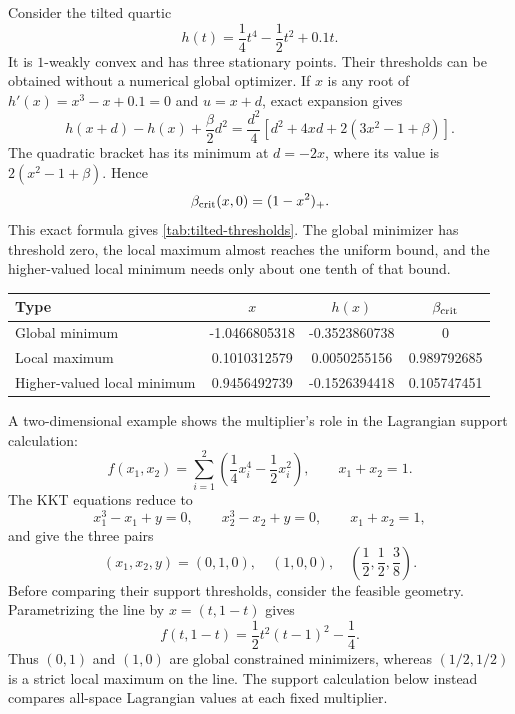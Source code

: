 Consider the tilted quartic
\begin{equation}
  h(t)=\frac14t^4-\frac12t^2+0.1t.
  \label{eq:tilted-quartic}
\end{equation}
It is \(1\)-weakly convex and has three stationary points.  Their thresholds
can be obtained without a numerical global optimizer.  If \(x\) is any root
of \(h'(x)=x^3-x+0.1=0\) and \(u=x+d\), exact expansion gives
\begin{equation}
  h(x+d)-h(x)+\frac{\beta}{2}d^2
  =
  \frac{d^2}{4}
  \left[
    d^2+4xd+2(3x^2-1+\beta)
  \right].
  \label{eq:tilted-quartic-factorization}
\end{equation}
The quadratic bracket has its minimum at \(d=-2x\), where its value is
\(2(x^2-1+\beta)\).  Hence
\begin{equation}
  \beta_{\mathrm{crit}}(x,0)=(1-x^2)_+ .
  \label{eq:tilted-quartic-exact-threshold}
\end{equation}
This exact formula gives \cref{tab:tilted-thresholds}.  The global minimizer
has threshold zero, the local maximum almost reaches the uniform bound, and
the higher-valued local minimum needs only about one tenth of that bound.

\begin{center}
  \captionsetup{hypcap=false}
  \centering
  \label{tab:tilted-thresholds}
  \begin{tabular}{lS[table-format=-1.10]S[table-format=-1.10]S[table-format=1.9]}
    \toprule
    Type & {$x$} & {$h(x)$} & {$\beta_{\mathrm{crit}}$}\\
    \midrule
    Global minimum       & -1.0466805318 & -0.3523860738 & 0\\
    Local maximum        &  0.1010312579 &  0.0050255156 & 0.989792685\\
    Higher-valued local minimum &  0.9456492739 & -0.1526394418 & 0.105747451\\
    \bottomrule
  \end{tabular}
\end{center}

A two-dimensional example shows the multiplier's role in the Lagrangian
support calculation:
\[
  f(x_1,x_2)=\sum_{i=1}^2
       \left(\frac14x_i^4-\frac12x_i^2\right),
  \qquad x_1+x_2=1.
\]
The KKT equations reduce to
\[
  x_1^3-x_1+y=0,\qquad
  x_2^3-x_2+y=0,\qquad
  x_1+x_2=1,
\]
and give the three pairs
\[
  (x_1,x_2,y)
  =
  (0,1,0),\quad(1,0,0),\quad
  \left(\frac12,\frac12,\frac38\right).
\]
Before comparing their support thresholds, consider the feasible geometry.
Parametrizing the line by \(x=(t,1-t)\) gives
\[
  f(t,1-t)=\frac12t^2(t-1)^2-\frac14.
\]
Thus \((0,1)\) and \((1,0)\) are global constrained minimizers, whereas
\((1/2,1/2)\) is a strict local maximum on the line.  The support calculation
below instead compares all-space Lagrangian values at each fixed multiplier.


